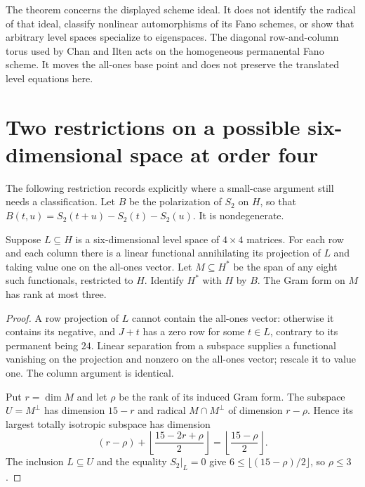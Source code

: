 The theorem concerns the displayed scheme ideal.  It does not identify the
radical of that ideal, classify nonlinear automorphisms of its Fano schemes, or
show that arbitrary level spaces specialize to eigenspaces.  The diagonal
row-and-column torus used by Chan and Ilten
\cite[Section~2.2, Proposition~2.3 and Remark~2.5]{CI} acts on the
homogeneous permanental Fano scheme.  It moves the all-ones base point and does
not preserve the translated level equations here.

\section{Two restrictions on a possible six-dimensional space at order four}

The following restriction records explicitly where a small-case argument still
needs a classification.  Let $B$ be the polarization of $S_2$ on $H$, so that
$B(t,u)=S_2(t+u)-S_2(t)-S_2(u)$.  It is nondegenerate.

\begin{proposition}\label{prop:normal-rank-four}
Suppose $L\subseteq H$ is a six-dimensional level space of $4\times4$ matrices.
For each row and each column there is a linear functional annihilating its
projection of $L$ and taking value one on the all-ones vector.  Let $M\subseteq H^*$
be the span of any eight such functionals, restricted to $H$.  Identify $H^*$ with
$H$ by $B$.  The Gram form on $M$ has rank at most three.
\end{proposition}

\begin{proof}
A row projection of $L$ cannot contain the all-ones vector: otherwise it contains
its negative, and $J+t$ has a zero row for some $t\in L$, contrary to its permanent
being $24$.  Linear separation from a subspace supplies a functional vanishing
on the projection and nonzero on the all-ones vector; rescale it to value one.
The column argument is identical.

Put $r=\dim M$ and let $\rho$ be the rank of its induced Gram form.  The subspace
$U=M^\perp$ has dimension $15-r$ and radical
$M\cap M^\perp$ of dimension $r-\rho$.  Hence its largest totally isotropic
subspace has dimension
\[
 (r-\rho)+\left\lfloor\frac{15-2r+\rho}{2}\right\rfloor
       =\left\lfloor\frac{15-\rho}{2}\right\rfloor.
\]
The inclusion $L\subseteq U$ and the equality $S_2|_L=0$ give
$6\leq\lfloor(15-\rho)/2\rfloor$, so $\rho\leq3$.
\end{proof}

